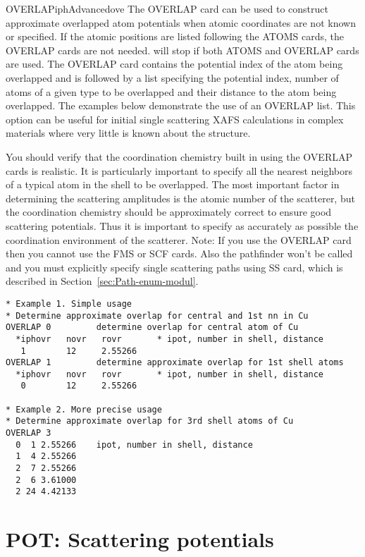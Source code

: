 \documentclass[11pt,oneside]{report} %
\begin{document}
\begin{Card}{OVERLAP}{iph}{Advanced}{ove}
  The OVERLAP card can be used to construct approximate overlapped
  atom potentials when atomic coordinates are not known or specified.
  If the atomic positions are listed following the ATOMS cards, the
  OVERLAP cards are not needed.  {\feffcur} will stop if both ATOMS and
  OVERLAP cards are used.  The OVERLAP card contains the potential
  index of the atom being overlapped and is followed by a list
  specifying the potential index, number of atoms of a given type to
  be overlapped and their distance to the atom being overlapped.  The
  examples below demonstrate the use of an OVERLAP list.  This option
  can be useful for initial single scattering XAFS calculations in
  complex materials where very little is known about the structure.

  You should verify that the coordination chemistry built in using the
  OVERLAP cards is realistic. It is particularly important to specify
  all the nearest neighbors of a typical atom in the shell to be
  overlapped. The most important factor in determining the scattering
  amplitudes is the atomic number of the scatterer, but the
  coordination chemistry should be approximately correct to ensure
  good scattering potentials. Thus it is important to specify as
  accurately as possible the coordination environment of the
  scatterer.  Note: If you use the OVERLAP card then you cannot use
  the FMS or SCF cards. Also the pathfinder won't be called and you
  must explicitly specify single scattering paths using SS card, which
  is described in Section~\ref{sec:Path-enum-modul}.

\begin{verbatim}
* Example 1. Simple usage
* Determine approximate overlap for central and 1st nn in Cu
OVERLAP 0         determine overlap for central atom of Cu
  *iphovr   novr   rovr       * ipot, number in shell, distance
   1        12     2.55266
OVERLAP 1         determine approximate overlap for 1st shell atoms
  *iphovr   novr   rovr       * ipot, number in shell, distance
   0        12     2.55266

* Example 2. More precise usage
* Determine approximate overlap for 3rd shell atoms of Cu
OVERLAP 3
  0  1 2.55266    ipot, number in shell, distance
  1  4 2.55266
  2  7 2.55266
  2  6 3.61000
  2 24 4.42133
\end{verbatim}
\end{Card}


\section{POT: Scattering potentials}
\label{sec:Scatt-potent-modul}
\end{document}
